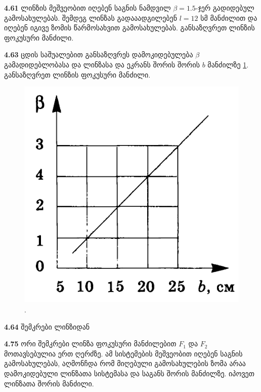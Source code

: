 \documentclass[a4paper]{book}
\begin{document}
\textbf{4.61} ლინზის მეშვეობით იღებენ საგნის ნამდვილ $\beta = 1.5$-ჯერ გადიდებულ გამოსახულებას. შემდეგ ლინზას გადააადგილებენ $l = 12$ სმ მანძილით და იღებენ იგივე ზომის წარმოსახვით გამოსახულებას. განსაზღვრეთ ლინზის ფოკუსური მანძილი.

\textbf{4.63} ცდის საშუალებით განსაზღვრეს დამოკიდებულება $\beta$ გამადიდებლობასა და ლინზასა და ეკრანს შორის შორის $b$ მანძილზე \ref{fig:4_63}. განსაზღვრეთ ლინზის ფოკუსური მანძილი.
	\begin{figure}[h]
		   \centering
           \includegraphics[width=0.4\columnwidth]{figures/4_63}
           \caption{.}
           \label{fig:4_63}
        \end{figure}

\textbf{4.64} შემკრები ლინზიდან

\textbf{4.75} ორი შემკრები ლინზა ფოკუსური მანძილებით $F_1$ და $F_2$ მოთავსებულია ერთ ღერძზე. ამ სისტემების მეშვეობით იღებენ საგნის გამოსახულებას, აღმონჩდა რომ მიღებული გამოსახულების ზომა არაა დამოკიდებული ლინზათა სისტემასა და საგანს შორის მანძილზე. იპოვეთ ლინზათა შორის მანძილი. 
\end{document}
